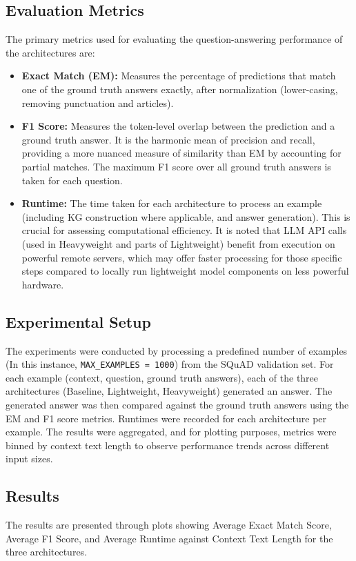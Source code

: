 \documentclass{article}
\begin{document}
\subsection{Evaluation Metrics}
The primary metrics used for evaluating the question-answering performance of the architectures are:
\begin{itemize}[noitemsep,topsep=0pt]
    \item \textbf{Exact Match (EM):} Measures the percentage of predictions that match one of the ground truth answers exactly, after normalization (lower-casing, removing punctuation and articles).
    \item \textbf{F1 Score:} Measures the token-level overlap between the prediction and a ground truth answer. It is the harmonic mean of precision and recall, providing a more nuanced measure of similarity than EM by accounting for partial matches. The maximum F1 score over all ground truth answers is taken for each question.
    \item \textbf{Runtime:} The time taken for each architecture to process an example (including KG construction where applicable, and answer generation). This is crucial for assessing computational efficiency. It is noted that LLM API calls (used in Heavyweight and parts of Lightweight) benefit from execution on powerful remote servers, which may offer faster processing for those specific steps compared to locally run lightweight model components on less powerful hardware.
\end{itemize}

\subsection{Experimental Setup}
The experiments were conducted by processing a predefined number of examples (In this instance, \texttt{MAX\_EXAMPLES = 1000}) from the SQuAD validation set. For each example (context, question, ground truth answers), each of the three architectures (Baseline, Lightweight, Heavyweight) generated an answer. The generated answer was then compared against the ground truth answers using the EM and F1 score metrics. Runtimes were recorded for each architecture per example.
The results were aggregated, and for plotting purposes, metrics were binned by context text length to observe performance trends across different input sizes.

\subsection{Results}
The results are presented through plots showing Average Exact Match Score, Average F1 Score, and Average Runtime against Context Text Length for the three architectures.
\end{document}
